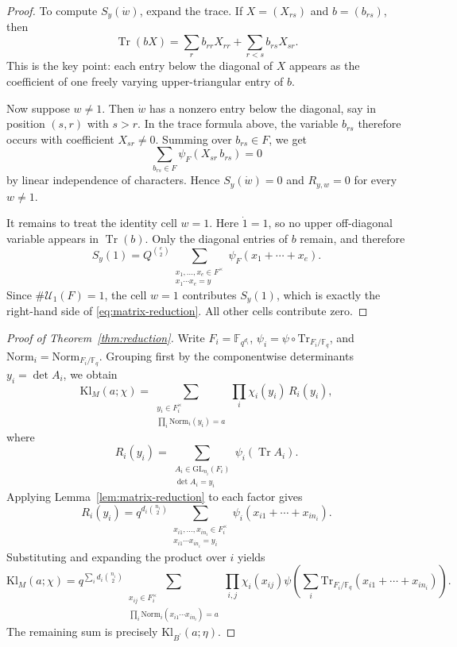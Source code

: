 \documentclass[11pt]{amsart}
\newcommand{\Kl}{\mathrm{Kl}}
\newcommand{\Norm}{\mathrm{Norm}}
\newcommand{\Trace}{\mathrm{Tr}}
\numberwithin{equation}{section}
\theoremstyle{remark}
\theoremstyle{plain}
\theoremstyle{definition}
\begin{document}
\begin{proof}
To compute \(S_y(\dot w)\), expand the trace.  If \(X=(X_{rs})\) and \(b=(b_{rs})\), then
\[
\operatorname{Tr}(bX)
=
\sum_r b_{rr}X_{rr}
+
\sum_{r<s} b_{rs}X_{sr}.
\]
This is the key point: each entry below the diagonal of \(X\) appears
as the coefficient of one freely varying upper-triangular entry of
\(b\).

Now suppose \(w\neq 1\).  Then \(\dot w\) has a nonzero entry below the
diagonal, say in position \((s,r)\) with \(s>r\).  In the trace
formula above, the variable \(b_{rs}\) therefore occurs with
coefficient \(X_{sr}\neq 0\).  Summing over \(b_{rs}\in F\), we get
\[
\sum_{b_{rs}\in F}\psi_F(X_{sr}\,b_{rs})
=
0
\]
by linear independence of characters.
Hence \(S_y(\dot w)=0\) and \(R_{y,w}=0\) for every \(w\neq 1\).

It remains to treat the identity cell \(w=1\).  Here \(\dot 1=1\), so no upper off-diagonal variable
appears in \(\operatorname{Tr}(b)\).  Only the diagonal entries of
\(b\) remain, and therefore
\[
S_y(1)=
Q^{\binom{e}{2}}
\sum_{\substack{x_1,\ldots,x_e\in F^\times\\
    x_1\cdots x_e=y}}
\psi_F(x_1+\cdots+x_e).
\]
Since \(\#\mathcal{U}_1(F)=1\), the cell \(w=1\) contributes
\(S_y(1)\), which is exactly the right-hand side of
\eqref{eq:matrix-reduction}.  All other cells contribute zero.
\end{proof}

\begin{proof}[Proof of Theorem~\ref{thm:reduction}]
Write \(F_i=\mathbb{F}_{q^{d_i}}\),
\(\psi_i=\psi\circ\Trace_{F_i/\mathbb{F}_q}\), and
\(\Norm_i=\Norm_{F_i/\mathbb{F}_q}\).  Grouping first by the
componentwise determinants \(y_i=\det A_i\), we obtain
\[
\Kl_M(a;\chi)
=
\sum_{\substack{y_i\in F_i^\times\\
    \prod_i\Norm_i(y_i)=a}}
\prod_i\chi_i(y_i)\,R_i(y_i),
\]
where
\[
R_i(y_i)
=
\sum_{\substack{A_i\in\mathrm{GL}_{n_i}(F_i)\\
    \det A_i=y_i}}
\psi_i(\operatorname{Tr}A_i).
\]
Applying Lemma~\ref{lem:matrix-reduction} to each factor gives
\[
R_i(y_i)
=
q^{d_i\binom{n_i}{2}}
\sum_{\substack{x_{i1},\ldots,x_{in_i}\in F_i^\times\\
    x_{i1}\cdots x_{in_i}=y_i}}
\psi_i(x_{i1}+\cdots+x_{in_i}).
\]
Substituting and expanding the product over \(i\) yields
\[
\Kl_M(a;\chi)
=
q^{\sum_i d_i\binom{n_i}{2}}
\sum_{\substack{x_{ij}\in F_i^\times\\
    \prod_i \Norm_i(x_{i1}\cdots x_{in_i})=a}}
\prod_{i,j}\chi_i(x_{ij})
\psi\!\left(
\sum_i\Trace_{F_i/\mathbb{F}_q}
(x_{i1}+\cdots+x_{in_i})
\right).
\]
The remaining sum is precisely \(\Kl_{B^{\prime}}(a;\eta)\).
\end{proof}
\end{document}
